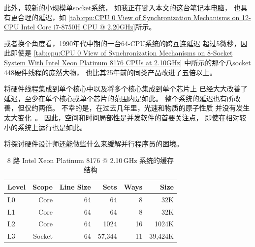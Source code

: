 {{	此外，较新的小规模单socket系统，
	如我正在键入本文的这台笔记本电脑，
	也具有更合理的延迟，如
	\cref{tab:cpu:CPU 0 View of Synchronization Mechanisms on 12-CPU Intel Core i7-8750H CPU @ 2.20GHz}所示。

	或者换个角度看，1990年代中期的一台64-CPU系统的跨互连延迟
	超过5微秒，因此即使是
	\cref{tab:cpu:CPU 0 View of Synchronization Mechanisms on 8-Socket System With Intel Xeon Platinum 8176 CPUs at 2.10GHz}
	中所示的那个八socket 448硬件线程的庞然大物，
	也比其25年前的同类产品改进了五倍以上。

	将硬件线程集成到单个核心中以及将多个核心集成到单个芯片上
	已经大大改善了延迟，至少在单个核心或单个芯片的范围内是如此。
	整个系统的延迟也有所改善，但仅约两倍。
	不幸的是，在过去几年里，光速和物质的原子性质
	并没有发生太大变化~\cite{NoBugsHare2016CPUoperations}。
	因此，空间和时间局部性是并发软件的首要关注点，
	即使在相对较小的系统上运行也是如此。

	将探讨硬件设计师还能做些什么来缓解并行程序员的困境。
}\QuickQuizEndB
%
\QuickQuizEndE
}                 %

\begin{table}
\renewcommand*{\arraystretch}{1.1}
\centering\small
\begin{tabular}{lrrrrr}
	\toprule
	Level &  Scope & Line Size &   Sets & Ways &    Size \\
	\midrule
	L0    &   Core &        64 &     64 &    8 &     32K \\
	L1    &   Core &        64 &     64 &    8 &     32K \\
	L2    &   Core &        64 &   1024 &   16 &   1024K \\
	L3    & Socket &        64 & 57,344 &   11 & 39,424K \\
	\bottomrule
\end{tabular}
\caption{8 路 Intel Xeon Platinum 8176 @ 2.10\,GHz 系统的缓存结构}
\label{tab:cpu:Cache Geometry for 8-Socket System With Intel Xeon Platinum 8176 CPUs @ 2.10GHz}
\end{table}

